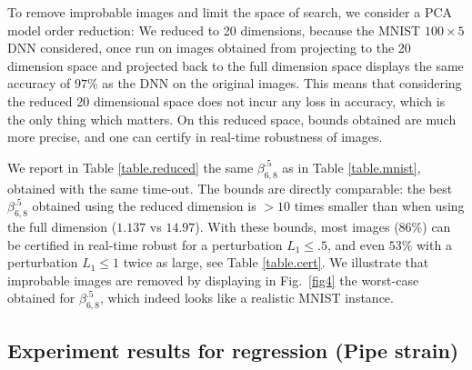 To remove improbable images and limit the space of search, 
we consider a PCA model order reduction: We reduced to 20 dimensions, because the MNIST $100 \times 5$ DNN considered, once run on images obtained from projecting to the 20 dimension space and projected back to the full dimension space displays the same accuracy of $97$\% as the DNN on the original images. This means that considering the reduced 20 dimensional space
does not incur any loss in accuracy, which is the only thing which matters. On this reduced space, bounds obtained are much more precise, and one can certify in real-time robustness of images.





We report in Table \ref{table.reduced} the same $\beta^{.5}_{6,8}$
as in Table \ref{table.mnist}, obtained with the same time-out. The bounds are directly comparable: the best $\beta^{.5}_{6,8}$ obtained using the reduced dimension is $>10$ times smaller than when using the full dimension ($1.137$ vs $14.97$). 
With these bounds, most images ($86\%$) can be certified in real-time robust for a perturbation $L_1 \leq .5$, and even $53\%$ with a perturbation $L_1 \leq 1$ twice as large, see Table \ref{table.cert}. We illustrate that improbable images are removed by displaying in Fig.~\ref{fig4} the worst-case obtained for $\beta^{.5}_{6,8}$, which indeed looks like a realistic MNIST instance.




	
	


	


\subsection{Experiment results for regression (Pipe strain)}


